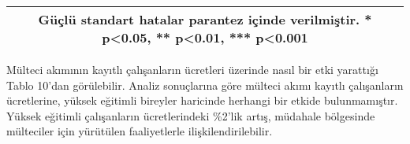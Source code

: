 \documentclass{article}
\begin{document}
\begin{justify}
\begin{table}[h]
\begin{tabular}{|ccccccc|}
                    \multicolumn{7}{|c|}{\scriptsize Güçlü standart hatalar parantez içinde verilmiştir.   * p<0.05, ** p<0.01, *** p<0.001}\\ \hline
                    
                \end{tabular}
        \end{table}
        \FloatBarrier

        Mülteci akımının kayıtlı çalışanların ücretleri üzerinde nasıl bir etki yarattığı Tablo 10'dan görülebilir.
        Analiz sonuçlarına göre mülteci akımı kayıtlı çalışanların ücretlerine, yüksek eğitimli bireyler haricinde
        herhangi bir etkide bulunmamıştır. Yüksek eğitimli çalışanların ücretlerindeki \%2'lik artış,
        müdahale bölgesinde mülteciler için yürütülen faaliyetlerle ilişkilendirilebilir.


\end{justify}
\end{document}
